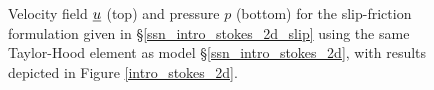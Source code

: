\begin{figure}
\begin{minipage}[b]{0.60\linewidth}
  \end{minipage}
  \caption[Two-dimensional-slip-friction Stokes example]{Velocity field $\underline{u}$ (top) and pressure $p$ (bottom) for the slip-friction formulation given in \S \ref{ssn_intro_stokes_2d_slip} using the same Taylor-Hood element as model \S \ref{ssn_intro_stokes_2d}, with results depicted in Figure \ref{intro_stokes_2d}.}
  \label{intro_stokes_2d_nitsche}
\end{figure}
